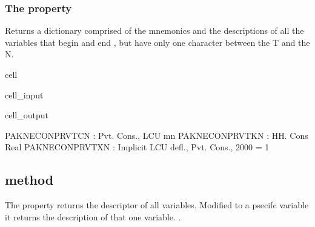 \documentclass[letterpaper,10pt,english]{jupyterBook}
\begin{document}
\subsubsection{The  property}
\label{\detokenize{content/05_WBModels/LoadingWBModel:the-des-property}}
\sphinxAtStartPar
{}

\sphinxAtStartPar
Returns a dictionary comprised of the mnemonics and the descriptions of all the variables that begin  and end , but have only one character between the T and the N.

\begin{sphinxuseclass}{cell}\begin{sphinxVerbatimInput}

\begin{sphinxuseclass}{cell_input}
\begin{sphinxVerbatim}[commandchars=\\\{\}]
\PYG{p}{[}\PYG{p}{]}
\end{sphinxVerbatim}

\end{sphinxuseclass}\end{sphinxVerbatimInput}
\begin{sphinxVerbatimOutput}

\begin{sphinxuseclass}{cell_output}
\begin{sphinxVerbatim}[commandchars=\\\{\}]
PAKNECONPRVTCN : Pvt. Cons., LCU mn
PAKNECONPRVTKN : HH. Cons Real
PAKNECONPRVTXN : Implicit LCU defl., Pvt. Cons., 2000 = 1
\end{sphinxVerbatim}

\end{sphinxuseclass}\end{sphinxVerbatimOutput}

\end{sphinxuseclass}

\subsection{ method}
\label{\detokenize{content/05_WBModels/LoadingWBModel:var-description-method}}
\sphinxAtStartPar
The property returns the descriptor of all variables.  Modified to a psecifc variable it returns the description of that one variable.  .
\end{document}
